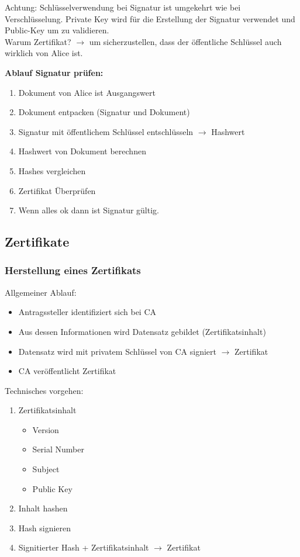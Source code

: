 \documentclass[12pt]{scrartcl}
\begin{document}
Achtung: Schlüsselverwendung bei Signatur ist umgekehrt wie bei Verschlüsselung. Private Key
wird für die Erstellung der Signatur verwendet und Public-Key um zu validieren.\\

Warum Zertifikat? $\rightarrow$ um sicherzustellen, dass der öffentliche Schlüssel auch wirklich
von Alice ist.


\textbf{Ablauf Signatur prüfen:}
\begin{enumerate}
    \item Dokument von Alice ist Ausgangswert
    \item Dokument entpacken (Signatur und Dokument)
    \item Signatur mit öffentlichem Schlüssel entschlüsseln $\rightarrow$ Hashwert
    \item Hashwert von Dokument berechnen
    \item Hashes vergleichen
    \item Zertifikat Überprüfen
    \item Wenn alles ok dann ist Signatur gültig.
\end{enumerate}



\newpage
\subsection{Zertifikate}

\subsubsection{Herstellung eines Zertifikats}


Allgemeiner Ablauf:
\begin{itemize}
    \item Antragssteller identifiziert sich bei CA
    \item Aus dessen Informationen wird Datensatz gebildet (Zertifikatsinhalt)
    \item Datensatz wird mit privatem Schlüssel von CA signiert $\rightarrow$ Zertifikat 
    \item CA veröffentlicht Zertifikat
\end{itemize}


Technisches vorgehen:
\begin{enumerate}
    \item Zertifikatsinhalt
          \begin{itemize}
              \item Version
              \item Serial Number
              \item Subject
              \item Public Key
          \end{itemize}
    \item Inhalt hashen
    \item Hash signieren
    \item Signitierter Hash + Zertifikatsinhalt $\rightarrow$ Zertifikat
\end{enumerate}
\end{document}
